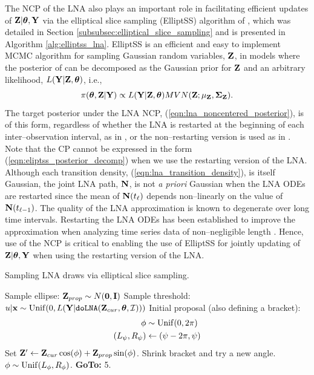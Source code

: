 The NCP of the LNA also plays an important role in facilitating efficient updates of $ \mathbf{Z}|\boldsymbol{\theta},\mathbf{Y} $ via the elliptical slice sampling (ElliptSS) algorithm of \cite{murray2010}, which was detailed in Section \ref{subsubsec:elliptical_slice_sampling} and is presented in Algorithm \ref{alg:elliptss_lna}. ElliptSS is an efficient and easy to implement MCMC algorithm for sampling Gaussian random variables, $ \mathbf{Z} $, in models where the posterior of can be decomposed as the Gaussian prior for $ \mathbf{Z} $ and an arbitrary likelihood, $ L(\mathbf{Y}|\mathbf{Z},\boldsymbol{\theta}) $, i.e.,
\begin{equation}
\label{eqn:eliptss_posterior_decomp}
\pi(\boldsymbol{\theta},\mathbf{Z}|\mathbf{Y})\propto L(\mathbf{Y}|\mathbf{Z},\boldsymbol{\theta})MVN(\mathbf{Z};\mu_{\mathbf{Z}},\boldsymbol{\Sigma}_{\mathbf{Z}}).
\end{equation}
The target posterior under the LNA NCP, (\ref{eqn:lna_noncentered_posterior}), is of this form, regardless of whether the LNA is restarted at the beginning of each inter--observation interval, as in \cite{fearnhead2014}, or the non--restarting version is used as in \cite{komorowski2009}. Note that the CP cannot be expressed in the form (\ref{eqn:eliptss_posterior_decomp}) when we use the restarting version of the LNA. Although each transition density, (\ref{eqn:lna_transition_density}), is itself Gaussian, the joint LNA path, $ \mathbf{N} $, is not \textit{a priori} Gaussian when the LNA ODEs are restarted since the mean of $ \mathbf{N}(t_\ell) $ depends non--linearly on the value of $ \mathbf{N}(t_{\ell-1}) $. The quality of the LNA approximation is known to degenerate over long time intervals. Restarting the LNA ODEs has been established to improve the approximation when analyzing time series data of non--negligible length \cite{fearnhead2014,giagos2010inference}. Hence, use of the NCP is critical to enabling the use of ElliptSS for jointly updating of $ \mathbf{Z}|\boldsymbol{\theta},\mathbf{Y} $ when using the restarting version of the LNA. 

\begin{algorithm}[h!]
	\caption{Sampling LNA draws via elliptical slice sampling.}
	\label{alg:elliptss_lna}
	\begin{algorithmic}[1]
		\State Sample ellipse: $ \mathbf{Z}_{prop} \sim N(\boldsymbol{0}, \mathbf{I}) $
		\State Sample threshold: $ u|\mathbf{x} \sim \mathrm{Unif}(0, L(\mathbf{Y}|\texttt{doLNA}(\mathbf{Z}_{cur},\boldsymbol{\theta},\mathcal{I}))) $
		\State Initial proposal (also defining a bracket): \vspace{-0.1in}
		\begin{align*}
		\phi &\sim \mathrm{Unif}(0,2\pi)\\
		(L_{\psi}, R_\psi) &\leftarrow (\psi - 2\pi, \psi)
		\end{align*}
		\State Set $ \mathbf{Z}' \leftarrow \mathbf{Z}_{cur}\cos(\phi) + \mathbf{Z}_{prop}\sin(\phi) $. 
		\State{}
		\Else
		\State Shrink bracket and try a new angle.
		\State $ \phi \sim \mathrm{Unif}(L_\phi, R_\phi) $.
		\State \textbf{GoTo:} 5.
		\EndIf
		\EndProcedure
	\end{algorithmic}
\end{algorithm}

